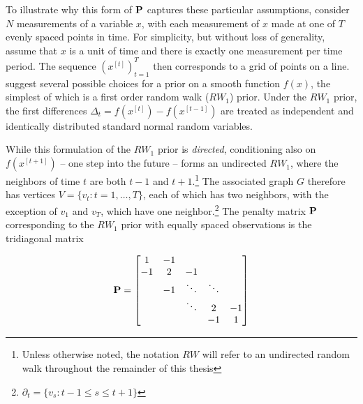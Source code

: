 To illustrate why this form of $\mathbf{P}$ captures these particular assumptions, consider $N$ measurements of a variable $x$, with each measurement of $x$ made at one of $T$ evenly spaced points in time. For simplicity, but without loss of generality,  assume that $x$ is a unit of time and there is exactly one measurement per time period.  The sequence $(x^{[t]})_{t=1}^T$ then corresponds to a grid of points on a line.   suggest several possible choices for a prior on a smooth function $f(x)$, the simplest of which is a first order random walk ($RW_1$) prior.  Under the $RW_1$ prior, the first differences $\Delta_t = f(x^{[t]}) - f(x^{[t-1]})$ are treated as independent and identically distributed standard normal random variables. 

While this formulation of the $RW_1$ prior is {\it directed}, conditioning also on $f(x^{[t+1]})$ -- one step into the future -- forms an undirected $RW_1$, where the neighbors of time $t$ are both $t-1$ and $t+1$.\footnote{Unless otherwise noted, the notation $RW$ will refer to an undirected random walk throughout the remainder of this thesis} The associated graph $G$ therefore has vertices $V=\{v_t : t=1,\dots,T\}$, each of which has two neighbors, with the exception of $v_1$ and $v_T$, which have one neighbor.\footnote{$\partial_t = \{v_{s} : t - 1 \leq s \leq t + 1\}$}  The penalty matrix $\mathbf{P}$ corresponding to the $RW_1$ prior with equally spaced observations is the tridiagonal matrix

\begin{equation*}
\mathbf{P} = 
\begin{bmatrix}
1  	& -1 	& 		& 	& \\
-1  	& 2 	& -1 		& 	& \\
  	& -1 	& \ddots 	& \ddots	& \\
  	&  	& \ddots 	& 2 	& -1\\
  	&  	& 		& -1 	& 1\\
\end{bmatrix}
\end{equation*}

